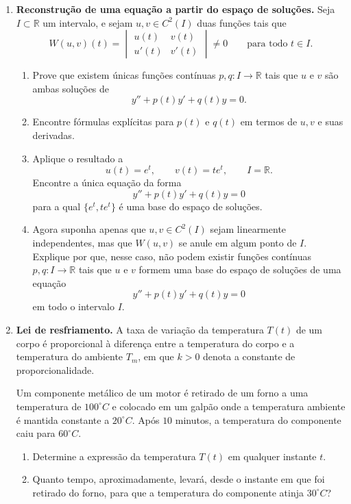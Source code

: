 \documentclass[a4paper,11pt,reqno]{amsart}
\begin{document}
\begin{enumerate}
\item \textbf{Reconstrução de uma equação a partir do espaço de soluções.}
Seja $I\subset\mathbb{R}$ um intervalo, e sejam $u,v\in C^2(I)$ duas funções tais que
\[
    W(u,v)(t)=
    \begin{vmatrix}
        u(t) & v(t)\\
        u'(t) & v'(t)
    \end{vmatrix}
    \neq 0
    \qquad\text{para todo }t\in I.
\]

\begin{enumerate}
    \item Prove que existem únicas funções contínuas $p,q:I\to\mathbb{R}$ tais que $u$ e $v$ são ambas soluções de
    \[
        y'' + p(t)y' + q(t)y = 0.
    \]

    \item Encontre fórmulas explícitas para $p(t)$ e $q(t)$ em termos de $u,v$ e suas derivadas.

    \item Aplique o resultado a
    \[
        u(t)=e^t,
        \qquad
        v(t)=te^t,
        \qquad
        I=\mathbb{R}.
    \]
    Encontre a única equação da forma
    \[
        y''+p(t)y'+q(t)y=0
    \]
    para a qual $\{e^t,te^t\}$ é uma base do espaço de soluções.

    \item Agora suponha apenas que $u,v\in C^2(I)$ sejam linearmente independentes, mas que $W(u,v)$ se anule em algum ponto de $I$. Explique por que, nesse caso, não podem existir funções contínuas $p,q:I\to\mathbb{R}$ tais que $u$ e $v$ formem uma base do espaço de soluções de uma equação
    \[
        y''+p(t)y'+q(t)y=0
    \]
    em todo o intervalo $I$.
\end{enumerate}


\item \textbf{Lei de resfriamento.}
A taxa de variação da temperatura $T(t)$ de um corpo é proporcional à diferença entre a temperatura do corpo e a temperatura do ambiente $T_m$, em que $k > 0$ denota a constante de proporcionalidade.

Um componente metálico de um motor é retirado de um forno a uma temperatura de $100^\circ C$ e colocado em um galpão onde a temperatura ambiente é mantida constante a $20^\circ C$. Após $10$ minutos, a temperatura do componente caiu para $60^\circ C$.

\begin{enumerate}
    \item Determine a expressão da temperatura $T(t)$ em qualquer instante $t$.
    \item Quanto tempo, aproximadamente, levará, desde o instante em que foi retirado do forno, para que a temperatura do componente atinja $30^\circ C$?
\end{enumerate}



\end{enumerate}
\end{document}
